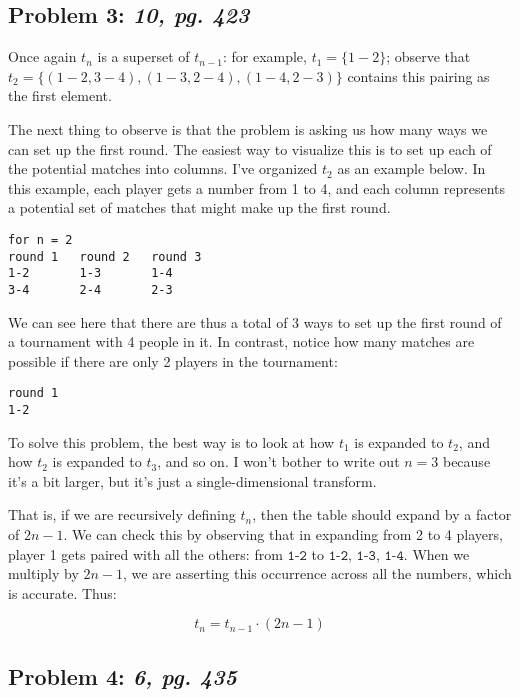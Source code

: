 \documentclass[a4paper]{article}
\begin{document}
\subsection*{Problem 3: \textit{10, pg. 423}}

Once again $t_n$ is a superset of $t_{n-1}$: for example, $t_1 = \{1-2\}$; observe that $t_2 = \{(1-2, 3-4), (1-3, 2-4), (1-4, 2-3)\}$ contains this pairing as the first element.

The next thing to observe is that the problem is asking us how many ways we can set up the first round. The easiest way to visualize this is to set up each of the potential matches into columns. I've organized $t_2$ as an example below. In this example, each player gets a number from 1 to 4, and each column represents a potential set of matches that might make up the first round.

\begin{verbatim}
for n = 2
round 1   round 2   round 3
1-2       1-3       1-4
3-4       2-4       2-3
\end{verbatim}

We can see here that there are thus a total of 3 ways to set up the first round of a tournament with 4 people in it. In contrast, notice how many matches are possible if there are only 2 players in the tournament:

\begin{verbatim}
round 1
1-2
\end{verbatim}

To solve this problem, the best way is to look at how $t_1$ is expanded to $t_2$, and how $t_2$ is expanded to $t_3$, and so on. I won't bother to write out $n=3$ because it's a bit larger, but it's just a single-dimensional transform.

That is, if we are recursively defining $t_n$, then the table should expand by a factor of $2n-1$. We can check this by observing that in expanding from 2 to 4 players, player 1 gets paired with all the others: from $\texttt{1-2}$ to $\texttt{1-2, 1-3, 1-4}$. When we multiply by $2n-1$, we are asserting this occurrence across all the numbers, which is accurate. Thus:

\begin{equation}
t_n = t_{n-1} \cdot (2n-1)
\end{equation}

\subsection*{Problem 4: \textit{6, pg. 435}} 
\end{document}
